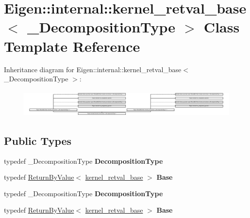 \hypertarget{struct_eigen_1_1internal_1_1kernel__retval__base}{}\section{Eigen\+:\+:internal\+:\+:kernel\+\_\+retval\+\_\+base$<$ \+\_\+\+Decomposition\+Type $>$ Class Template Reference}
\label{struct_eigen_1_1internal_1_1kernel__retval__base}
Inheritance diagram for Eigen\+:\+:internal\+:\+:kernel\+\_\+retval\+\_\+base$<$ \+\_\+\+Decomposition\+Type $>$\+:\begin{figure}[H]
\begin{center}
\leavevmode
\includegraphics[height=1.465969cm]{struct_eigen_1_1internal_1_1kernel__retval__base}
\end{center}
\end{figure}
\subsection*{Public Types}
\begin{DoxyCompactItemize}
\item 
\mbox{\label{struct_eigen_1_1internal_1_1kernel__retval__base_a6b10bb396c0cb35e768a15ad1ce76b14}} 
typedef \+\_\+\+Decomposition\+Type {\bfseries Decomposition\+Type}
\item 
\mbox{\label{struct_eigen_1_1internal_1_1kernel__retval__base_a2d5e5e8e131daa386f63e38d55a8221d}} 
typedef \hyperlink{group___core___module_class_eigen_1_1_return_by_value}{Return\+By\+Value}$<$ \hyperlink{struct_eigen_1_1internal_1_1kernel__retval__base}{kernel\+\_\+retval\+\_\+base} $>$ {\bfseries Base}
\item 
\mbox{\label{struct_eigen_1_1internal_1_1kernel__retval__base_a6b10bb396c0cb35e768a15ad1ce76b14}} 
typedef \+\_\+\+Decomposition\+Type {\bfseries Decomposition\+Type}
\item 
\mbox{\label{struct_eigen_1_1internal_1_1kernel__retval__base_a2d5e5e8e131daa386f63e38d55a8221d}} 
typedef \hyperlink{group___core___module_class_eigen_1_1_return_by_value}{Return\+By\+Value}$<$ \hyperlink{struct_eigen_1_1internal_1_1kernel__retval__base}{kernel\+\_\+retval\+\_\+base} $>$ {\bfseries Base}
\end{DoxyCompactItemize}

